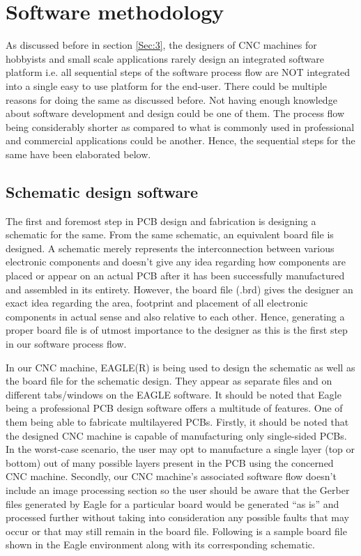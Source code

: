 \chapter{Software methodology}

As discussed before in section \ref{Sec:3}, the designers of CNC machines for hobbyists and small scale applications rarely design an integrated software platform i.e. all sequential steps of the software process flow are NOT integrated into a single easy to use platform for the end-user. There could be multiple reasons for doing the same as discussed before. Not having enough knowledge about software development and design could be one of them. The process flow being considerably shorter as compared to what is commonly used in professional and commercial applications could be another. Hence, the sequential steps for the same have been elaborated below.

\section{Schematic design software}

The first and foremost step in PCB design and fabrication is designing a schematic for the same. From the same schematic, an equivalent board file is designed. A schematic merely represents the interconnection between various electronic components and doesn’t give any idea regarding how components are placed or appear on an actual PCB after it has been successfully manufactured and assembled in its entirety. However, the board file (.brd) gives the designer an exact idea regarding the area, footprint and placement of all electronic components in actual sense and also relative to each other. Hence, generating a proper board file is of utmost importance to the designer as this is the first step in our software process flow. \par

In our CNC machine, EAGLE(R) is being used to design the schematic as well as the board file for the schematic design. They appear as separate files and on different tabs/windows on the EAGLE software.  It should be noted that Eagle being a professional PCB design software offers a multitude of features. One of them being able to fabricate multilayered PCBs. Firstly, it should be noted that the designed CNC machine is capable of manufacturing only single-sided PCBs. In the worst-case scenario, the user may opt to manufacture a single layer (top or bottom) out of many possible layers present in the PCB using the concerned CNC machine. Secondly, our CNC machine’s associated software flow doesn’t include an image processing section so the user should be aware that the Gerber files generated by Eagle for a particular board would be generated “as is” and processed further without taking into consideration any possible faults that may occur or that may still remain in the board file. Following is a sample board file shown in the Eagle environment along with its corresponding schematic. \par


